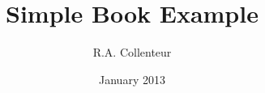 \documentclass[a4paper,12pt]{book}
\begin{document}
\author{R.A. Collenteur}
\title{Simple Book Example}
\date{January 2013}

\frontmatter
\maketitle
\tableofcontents

\mainmatter



\backmatter
\end{document}
